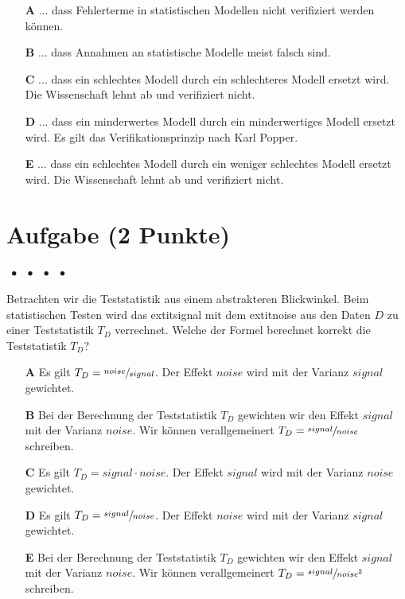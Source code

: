 \documentclass[a4paper, 9pt]{scrartcl}\usepackage[]{graphicx}\usepackage[]{xcolor}
\begin{document}
\begin{enumerate}
\item [\textbf{A} \msquare] ... dass Fehlerterme in statistischen Modellen nicht verifiziert werden können.
\item [\textbf{B} \msquare] ... dass Annahmen an statistische Modelle meist falsch sind.
\item [\textbf{C} \msquare] ... dass ein schlechtes Modell durch ein schlechteres Modell ersetzt wird. Die Wissenschaft lehnt ab und verifiziert nicht.
\item [\textbf{D} \msquare] ... dass ein minderwertes Modell durch ein minderwertiges Modell ersetzt wird. Es gilt das Verifikationsprinzip nach Karl Popper.
\item [\textbf{E} \msquare] ... dass ein schlechtes Modell durch ein weniger schlechtes Modell ersetzt wird. Die Wissenschaft lehnt ab und verifiziert nicht.
\end{enumerate}

\section{Aufgabe \hfill (2 Punkte)}

\ifcollection
\begin{flushright}
\tiny\vspace{-2Ex}
\textbf{\examinhaltstart}
\exammodulemathstat $\;\bullet$
\exammodulestat $\;\bullet$
\exammodulestatbbv $\;\bullet$
\exammodulestatversuch $\;\bullet$
\exammodulebiostat
\vspace{-1Ex}
\end{flushright}
\fi




Betrachten wir die Teststatistik aus einem abstrakteren Blickwinkel. Beim statistischen Testen wird das 	extit{signal} mit dem 	extit{noise} aus den Daten $D$ zu einer Teststatistik $T_D$ verrechnet. Welche der Formel berechnet korrekt die Teststatistik $T_D$?



\begin{enumerate}
\item [\textbf{A} \msquare] Es gilt $T_D = \sfrac{noise}{signal}$. Der Effekt $noise$ wird mit der Varianz $signal$ gewichtet.
\item [\textbf{B} \msquare] Bei der Berechnung der Teststatistik $T_D$ gewichten wir den Effekt $signal$ mit der Varianz $noise$. Wir können verallgemeinert $T_D = \sfrac{signal}{noise}$ schreiben.
\item [\textbf{C} \msquare] Es gilt $T_D = signal \cdot noise$. Der Effekt $signal$ wird mit der Varianz $noise$ gewichtet.
\item [\textbf{D} \msquare] Es gilt $T_D = \sfrac{signal}{noise}$. Der Effekt $noise$ wird mit der Varianz $signal$ gewichtet.
\item [\textbf{E} \msquare] Bei der Berechnung der Teststatistik $T_D$ gewichten wir den Effekt $signal$ mit der Varianz $noise$. Wir können verallgemeinert $T_D = \sfrac{signal}{noise^2}$ schreiben.
\end{enumerate}
\end{document}
